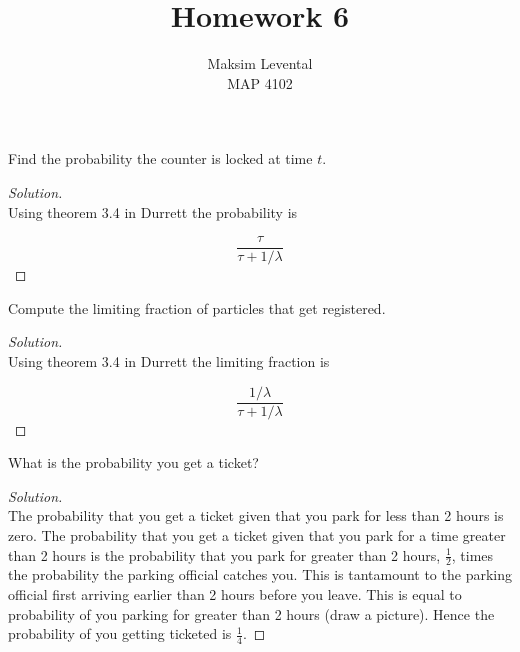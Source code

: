 \documentclass[12pt]{article}
\newenvironment{problem}[2][Problem]{\begin{trivlist}
\item[\hskip \labelsep {\bfseries #1}\hskip \labelsep {\bfseries #2.}]}{\end{trivlist}}
\newenvironment{solution}
  {\begin{proof}[Solution]\renewcommand{\qedsymbol}{}}
  {\end{proof}}
\begin{document}
 
 
\title{Homework 6}%
\author{Maksim Levental\\ %
MAP 4102} %
 
\maketitle
 
\begin{problem}{3.8(a)} %
Find the probability the counter is locked at time $t$.
\end{problem}
 
\begin{solution}\ \\
Using theorem 3.4 in Durrett the probability is 

$$ \frac{\tau}{\tau + 1/\lambda} $$
\end{solution}
\begin{problem}{3.8(b)} %
Compute the limiting fraction of particles that get registered.
\end{problem}
 
\begin{solution}\ \\
Using theorem 3.4 in Durrett the limiting fraction is

$$ \frac{1/\lambda}{\tau + 1/\lambda} $$
\end{solution}
\begin{problem}{3.21}
What is the probability you get a ticket?
\end{problem}
\begin{solution}\ \\
The probability that you get a ticket given that you park for less than 2 hours is zero. The probability that you get a ticket given that you park for a time greater than 2 hours is the probability that you park for greater than 2 hours, $\frac{1}{2}$, times the probability the parking official catches you. This is tantamount to the parking official first arriving earlier than 2 hours before you leave. This is equal to probability of you parking for greater than 2 hours (draw a picture). Hence the probability of you getting ticketed is $\frac{1}{4}$.
\end{solution}
\end{document}
